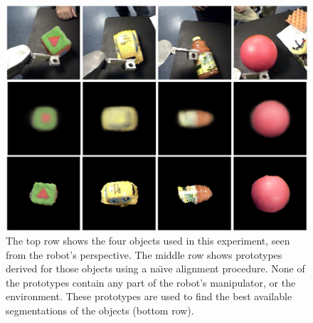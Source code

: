 %
\begin{figure}[tb]
\begin{center}
\includegraphics[width=\columnwidth]{fig-auto-proto.eps}
\caption{ 
\label{fig:auto-proto}
%
The top row shows the four objects used in this 
experiment, seen from the robot's perspective.  The 
middle row shows prototypes derived for those objects
using a na\"{\i}ve alignment procedure.  
None of the prototypes contain
any part of the robot's manipulator, or the 
environment.  These prototypes are used 
to find the best available segmentations
of the objects (bottom row).
%
}
\end{center}
\end{figure}


